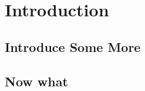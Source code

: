 \documentclass[a4paper, 12pt, oneside, onecolumn, openright]{mememoir}
\begin{document}


\frontmatter
\pagestyle{plain}





\tableofcontents*

\mainmatter

\pagestyle{sjt}


\chapter{Introduction}
\lipsum[12-23]

\section{Introduce Some More}

\lipsum[12]

\section{Now what}

\lipsum[42]

\nocite{GT}
\nocite{T1}
\nocite{T2}
\nocite{T3}
\nocite{lova}
\nocite{thom}



\end{document}
